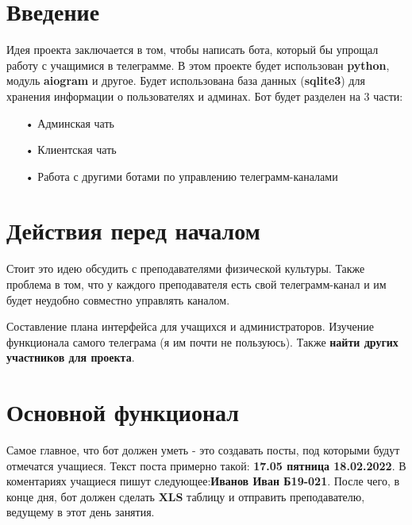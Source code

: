 



\newpage 

\tableofcontents

\newpage
\section{Введение}
 Идея проекта заключается в том, чтобы написать бота, который бы упрощал работу с учащимися в телеграмме. В этом проекте будет использован \textbf{python}, модуль \textbf{aiogram} и другое. Будет использована база данных (\textbf{sqlite3}) для хранения информации о пользователях и админах.  Бот будет разделен на 3 части:
 \begin{enumerate}
 \item[•] Админская чать
 \item[•] Клиентская чать
 \item[•] Работа с другими ботами по управлению телеграмм-каналами
 \end{enumerate}
 \section{Действия перед началом}
 Стоит это идею обсудить с преподавателями физической культуры. Также проблема в том, что у каждого преподавателя есть свой телеграмм-канал и им будет неудобно совместно управлять каналом.
 
  Составление плана интерфейса для учащихся и администраторов. Изучение функционала самого телеграма (я им почти не пользуюсь). Также \textbf{найти других участников для проекта}.
  \section{Основной функционал}
 Самое главное, что бот должен уметь - это создавать посты, под которыми будут отмечатся учащиеся. Текст поста примерно такой:  \textbf{17.05 пятница 18.02.2022}. В коментариях учащиеся пишут следующее:\textbf{Иванов Иван Б19-021}. После чего, в конце дня, бот должен сделать \textbf{XLS} таблицу и отправить преподавателю, ведущему в этот день занятия. 
